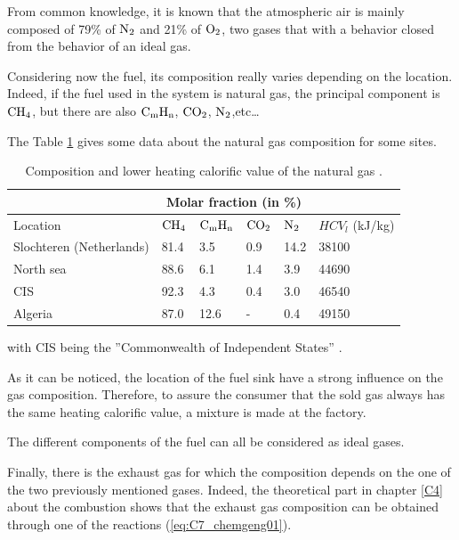From common knowledge, it is known that the atmospheric air is mainly composed of 79\% of $\ce{N2}$ and 21\% of $\ce{O2}$, two gases that with a behavior closed from the behavior of an ideal gas.

Considering now the fuel, its composition really varies depending on the location. Indeed, if the fuel used in the system is natural gas, the principal component is $\ce{CH4}$, but there are also $\ce{C}_\text{m}\ce{H}_\text{n}$, $\ce{CO2}$, $\ce{N2}$,etc\dots

The Table \ref{tab:C7_compgas} gives some data about the natural gas composition for some sites.

\begin{longtable}[c]{llllll}
\caption{Composition and lower heating calorific value of the natural gas \cite{Leonard2018}.}
\label{tab:C7_compgas}\\
\hline
\textbf{\textbf{}}       & \multicolumn{4}{c}{\textbf{Molar fraction (in \%)}}                    &                 \\ \hline
\endfirsthead
%
\endhead
%
\hline
\endfoot
%
\endlastfoot
%
Location                 & $\ce{CH4}$ & $\ce{C}_\text{m}\ce{H}_\text{n}$ & $\ce{CO2}$ & $\ce{N2}$ & $HCV_l$ (kJ/kg) \\
Slochteren (Netherlands) & 81.4       & 3.5                              & 0.9        & 14.2      & 38100           \\
North sea                & 88.6       & 6.1                              & 1.4        & 3.9       & 44690           \\
CIS                      & 92.3       & 4.3                              & 0.4        & 3.0       & 46540           \\
Algeria                  & 87.0       & 12.6                             & -          & 0.4       & 49150           \\ \hline
\end{longtable}
with CIS being the ''Commonwealth of Independent States'' \cite{EncyclopaediaBritannica2018}.

As it can be noticed, the location of the fuel sink have a strong influence on the gas composition. Therefore, to assure the consumer that the sold gas always has the same heating calorific value, a mixture is made at the factory. 

The different components of the fuel can all be considered as ideal gases. 

Finally, there is the exhaust gas for which the composition depends on the one of the two previously mentioned gases. Indeed, the theoretical part in chapter \ref{C4} about the combustion shows that the exhaust gas composition can be obtained through one of the reactions (\ref{eq:C7_chemgeng01}).

